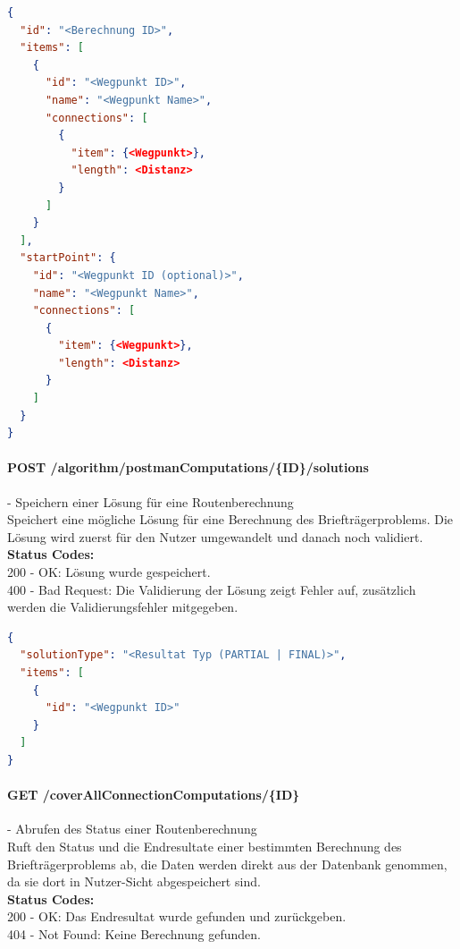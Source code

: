 \begin{lstlisting}[language=JSON, caption=Beispiel für Eingabedaten des Briefträgerproblems für den Algorithmus, label=lst:input_postman_algo]  
{
  "id": "<Berechnung ID>",
  "items": [
    {
      "id": "<Wegpunkt ID>",
      "name": "<Wegpunkt Name>",
      "connections": [
        {
          "item": {<Wegpunkt>},
          "length": <Distanz>
        }
      ]
    }
  ],
  "startPoint": {
    "id": "<Wegpunkt ID (optional)>",
    "name": "<Wegpunkt Name>",
    "connections": [
      {
        "item": {<Wegpunkt>},
        "length": <Distanz>
      }
    ]
  }
}
\end{lstlisting}

\paragraph{POST /algorithm/postmanComputations/\{ID\}/solutions} - Speichern einer Lösung für eine Routenberechnung \mbox{}\\
Speichert eine mögliche Lösung für eine Berechnung des Briefträgerproblems. Die Lösung wird zuerst für den Nutzer umgewandelt und danach noch validiert.\\
\textbf{Status Codes:}\\
200 - OK: Lösung wurde gespeichert.\\
400 - Bad Request: Die Validierung der Lösung zeigt Fehler auf, zusätzlich werden die Validierungsfehler mitgegeben.\\

\begin{lstlisting}[language=JSON, caption=Beispiel eines Resultates für das Briefträgerproblem aus Algorithmus-Sicht, label=lst:solution_postman_algo]  
{
  "solutionType": "<Resultat Typ (PARTIAL | FINAL)>",
  "items": [
    {
      "id": "<Wegpunkt ID>"
    }
  ]
}
\end{lstlisting}

\paragraph{GET /coverAllConnectionComputations/\{ID\}} - Abrufen des Status einer Routenberechnung\mbox{}\\
Ruft den Status und die Endresultate einer bestimmten Berechnung des Briefträgerproblems ab, die Daten werden direkt aus der Datenbank genommen, da sie dort in Nutzer-Sicht abgespeichert sind.\\
\textbf{Status Codes:}\\
200 - OK: Das Endresultat wurde gefunden und zurückgeben.\\
404 - Not Found: Keine Berechnung gefunden.\\

